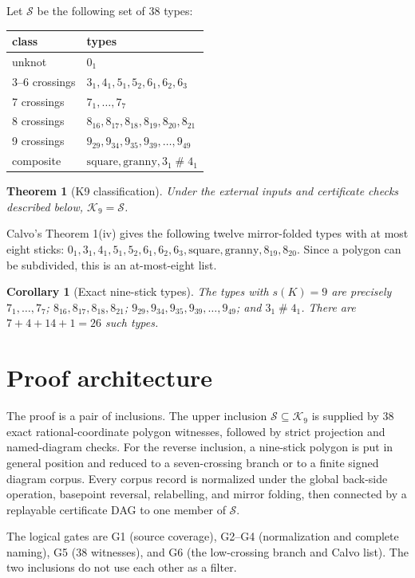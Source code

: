 \documentclass[11pt]{article}
\newtheorem{theorem}{Theorem}
\newtheorem{corollary}{Corollary}
\newcommand{\K}{\mathcal K}
\newcommand{\Sset}{\mathcal S}
\begin{document}
Let $\Sset$ be the following set of 38 types:
\begin{center}\begin{tabular}{ll}\toprule
class & types\\\midrule
unknot & $0_1$\\
3--6 crossings & $3_1,4_1,5_1,5_2,6_1,6_2,6_3$\\
7 crossings & $7_1,\ldots,7_7$\\
8 crossings & $8_{16},8_{17},8_{18},8_{19},8_{20},8_{21}$\\
9 crossings & $9_{29},9_{34},9_{35},9_{39},\ldots,9_{49}$\\
composite & $\mathrm{square},\mathrm{granny},3_1\mathbin\#4_1$\\\bottomrule\end{tabular}\end{center}
\begin{theorem}[K9 classification]
Under the external inputs and certificate checks described below, $\K_9=\Sset$.
\end{theorem}
Calvo's Theorem 1(iv) gives the following twelve mirror-folded types with at most eight sticks: $0_1,3_1,4_1,5_1,5_2,6_1,6_2,6_3,\mathrm{square},\mathrm{granny},8_{19},8_{20}$. Since a polygon can be subdivided, this is an at-most-eight list.
\begin{corollary}[Exact nine-stick types]
The types with $s(K)=9$ are precisely $7_1,\ldots,7_7$; $8_{16},8_{17},8_{18},8_{21}$; $9_{29},9_{34},9_{35},9_{39},\ldots,9_{49}$; and $3_1\mathbin\#4_1$. There are $7+4+14+1=26$ such types.
\end{corollary}
\section{Proof architecture}
The proof is a pair of inclusions. The upper inclusion $\Sset\subseteq\K_9$ is supplied by 38 exact rational-coordinate polygon witnesses, followed by strict projection and named-diagram checks. For the reverse inclusion, a nine-stick polygon is put in general position and reduced to a seven-crossing branch or to a finite signed diagram corpus. Every corpus record is normalized under the global back-side operation, basepoint reversal, relabelling, and mirror folding, then connected by a replayable certificate DAG to one member of $\Sset$.

The logical gates are G1 (source coverage), G2--G4 (normalization and complete naming), G5 (38 witnesses), and G6 (the low-crossing branch and Calvo list). The two inclusions do not use each other as a filter.
\end{document}
